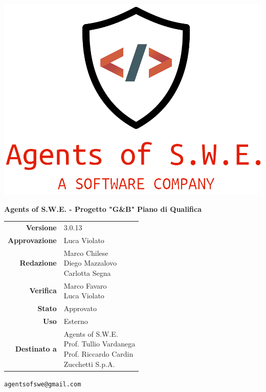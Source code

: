 


\begin{titlepage}
\thispagestyle{empty}

\begin{center}

\includegraphics[scale=0.3]{./images/logo.png} 

\large \textbf{Agents of S.W.E. - Progetto "G\&B"}
\vfill
\Huge \textbf{Piano di Qualifica}
\vfill
\large
\renewcommand{\arraystretch}{1.3}
\begin{tabular}{r|l}
\textbf{Versione} & 3.0.13\\
\textbf{Approvazione} & Luca Violato\\
\textbf{Redazione} & \parbox[t]{5cm}{Marco Chilese\\Diego Mazzalovo\\Carlotta Segna}\\
\textbf{Verifica} & \parbox[t]{5cm}{Marco Favaro\\Luca Violato}\\
\textbf{Stato} & Approvato\\
\textbf{Uso} & Esterno\\
\textbf{Destinato a} & \parbox[t]{5cm}{Agents of S.W.E. \\Prof. Tullio Vardanega\\Prof. Riccardo Cardin\\Zucchetti S.p.A.}
\end{tabular}
\vfill
\small
\texttt{agentsofswe@gmail.com}
\end{center}
\end{titlepage}

